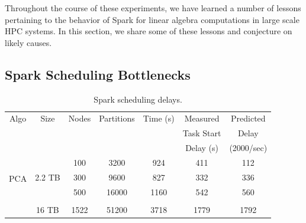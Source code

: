 Throughout the course of these experiments, we have learned a number of lessons pertaining to the behavior of Spark for linear algebra computations in large scale HPC systems. 
In this section, we share some of these lessons and conjecture on likely causes.
\subsection{Spark Scheduling Bottlenecks}

\begin{table}[th]
\centering
\begin{tabular}{| c | c | c | c | c | c | c |}
\hline
Algo & Size & Nodes & Partitions & Time (s) & Measured & Predicted \\
{} & {} & {} & {} & {} & Task Start & Delay \\
{} & {} & {} & {} & {} & Delay (s) & (2000/sec) \\
\hline
\multirow{4}{*}{PCA} & \multirow{3}{*}{2.2 TB} & 100 & 3200 & 924 & 411 & 112 \\
 {} & {} & 300 & 9600 & 827 & 332 & 336 \\
 {} & {} & 500 & 16000 & 1160 & 542 & 560 \\ \cline{2-7} & & & & & & \\[-1ex]
 {} & {16 TB} & 1522 & 51200 & 3718 & 1779 & 1792 \\
 \hline
\end{tabular}
\caption{Spark scheduling delays.}
\label{tab:scheduling}
\end{table}

